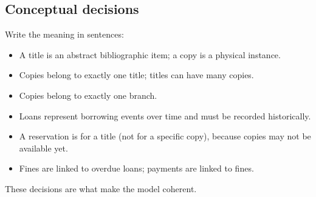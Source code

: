 \subsection{Conceptual decisions}
Write the meaning in sentences:
\begin{itemize}
  \item A title is an abstract bibliographic item; a copy is a physical instance.
  \item Copies belong to exactly one title; titles can have many copies.
  \item Copies belong to exactly one branch.
  \item Loans represent borrowing events over time and must be recorded historically.
  \item A reservation is for a title (not for a specific copy), because copies may not be available yet.
  \item Fines are linked to overdue loans; payments are linked to fines.
\end{itemize}

These decisions are what make the model coherent.


